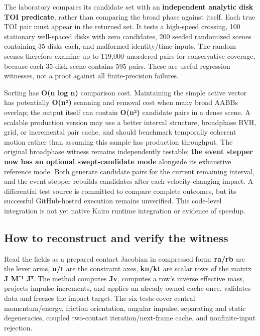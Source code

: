 The laboratory compares its candidate set with an \textbf{independent analytic disk TOI predicate}, rather than comparing the broad phase against itself. Each true TOI pair must appear in the returned set. It tests a high-speed crossing, 100 stationary well-spaced disks with zero candidates, 200 seeded randomized scenes containing 35 disks each, and malformed identity/time inputs. The random scenes therefore examine up to 119,000 unordered pairs for conservative coverage, because each 35-disk scene contains 595 pairs. These are useful regression witnesses, not a proof against all finite-precision failures.

Sorting has \textbf{O(n log n)} comparison cost. Maintaining the simple active vector has potentially \textbf{O(n²)} scanning and removal cost when many broad AABBs overlap; the output itself can contain \textbf{O(n²)} candidate pairs in a dense scene. A scalable production version may use a better interval structure, broadphase BVH, grid, or incremental pair cache, and should benchmark temporally coherent motion rather than assuming this sample has production throughput. The original broadphase witness remains independently testable; \textbf{the event stepper now has an optional swept-candidate mode} alongside its exhaustive reference mode. Both generate candidate pairs for the current remaining interval, and the event stepper rebuilds candidates after each velocity-changing impact. A differential test source is committed to compare complete outcomes, but its successful GitHub-hosted execution remains unverified. This code-level integration is not yet native Kairo runtime integration or evidence of speedup.

\subsection{How to reconstruct and verify the witness}\label{appendix-c9d92e145503-how-to-reconstruct-and-verify-the-witness}

\hypertarget{appendix-c9d92e145503-how-to-reconstruct-and-verify-the-witness}{}

Read the  fields as a prepared contact Jacobian in compressed form: \textbf{ra/rb} are the lever arms, \textbf{n/t} are the constraint axes, \textbf{kn/kt} are scalar rows of the matrix \textbf{J M⁻¹ Jᵀ}. The method  computes \textbf{Jv},  computes a row's inverse effective mass,  projects impulse increments, and  applies an already-owned cache once.  validates data and freezes the impact target. The six tests cover central momentum/energy, friction orientation, angular impulse, separating and static degeneracies, coupled two-contact iteration/next-frame cache, and nonfinite-input rejection.

